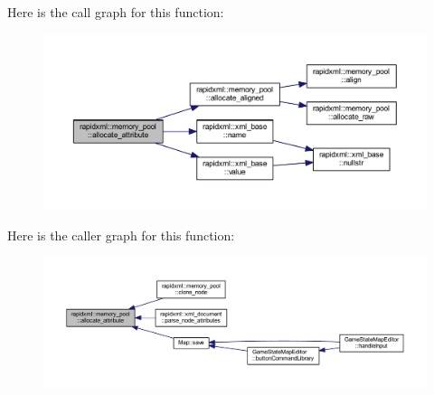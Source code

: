 Here is the call graph for this function\+:\nopagebreak
\begin{figure}[H]
\begin{center}
\leavevmode
\includegraphics[width=350pt]{classrapidxml_1_1memory__pool_a3de2a66c983336e006ea3844e244ed30_cgraph}
\end{center}
\end{figure}




Here is the caller graph for this function\+:
\nopagebreak
\begin{figure}[H]
\begin{center}
\leavevmode
\includegraphics[width=350pt]{classrapidxml_1_1memory__pool_a3de2a66c983336e006ea3844e244ed30_icgraph}
\end{center}
\end{figure}


